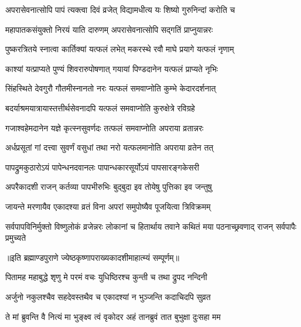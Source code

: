 \twolineshloka
{अपरासेवनात्सोपि पापं त्यक्त्वा दिवं व्रजेत्}
{विद्यामधीत्य यः शिष्यो गुरुनिन्दां करोति च} %

\twolineshloka
{महापातकसंयुक्तो निरयं याति दारुणम्}
{अपरासेवनात्सोपि सद्गतिं प्राप्नुयान्नरः} %

\twolineshloka
{पुष्करत्रितये स्नात्वा कार्तिक्यां यत्फलं लभेत्}
{मकरस्थे रवौ माघे प्रयागे यत्फलं नृणाम्} %

\twolineshloka
{काश्यां यत्प्राप्यते पुण्यं शिवरारुपोषणात्}
{गयायां पिण्डदानेन यत्फलं प्राप्यते नृभिः} %

\twolineshloka
{सिंहस्थिते देवगुरौ गौतमीस्नानतो नरः}
{यत्फलं समवाप्नोति कुम्भे केदारदर्शनात्} %

\twolineshloka
{बदर्याश्रमयात्रायास्तत्तीर्थसेवनादपि}
{यत्फलं समवाप्नोति कुरुक्षेत्रे रविग्रहे} %

\twolineshloka
{गजाश्वहेमदानेन यज्ञे कृत्स्नसुवर्णदः}
{तत्फलं समवाप्नोति अपराया व्रतान्नरः} %

\twolineshloka
{अर्धप्रसूतां गां दत्त्वा सुवर्णं वसुधां तथा}
{नरो यत्फलमानोति अपराया व्रतेन तत्} %

\twolineshloka
{पापद्रुमकुठारोऽयं पापेन्धनदवानलः}
{पापान्धकारसूर्योऽयं पापसारङ्गकेसरी} %

\twolineshloka
{अपरैकादशी राजन् कर्तव्या पापभीरुभिः}
{बुद्बुदा इव तोयेषु पुत्तिका इव जन्तुषु} %

\twolineshloka
{जायन्ते मरणायैव एकादश्या व्रतं विना}
{अपरां समुपोष्यैव पूजयित्वा त्रिविक्रमम्} %


\threelineshloka
{सर्वपापविनिर्मुक्तो विष्णुलोकं व्रजेन्नरः}
{लोकानां च हितार्थाय तवाने कथितं मया}
{पठनाच्छ्रवणाद् राजन् सर्वपापैः प्रमुच्यते} %

॥इति ब्रह्माण्डपुराणे ज्येष्ठकृष्णापराख्यकादशीमाहात्म्यं सम्पूर्णम्॥


\hyperref[sec:ekadashi_mahatmyam_vrata_raja]{\closesub}
\clearpage

\label{sec:vrata-raja-jyeshtha-shukla-nirjala}


\twolineshloka
{पितामह महाबुद्धे शृणु मे परमं वचः}
{युधिष्ठिरश्च कुन्ती च तथा द्रुपद नन्दिनी} %

\twolineshloka
{अर्जुनो नकुलश्चैव सहदेवस्तथैव च}
{एकादश्यां न भुञ्जन्ति कदाचिदपि सुव्रत} %

\twolineshloka
{ते मां ब्रुवन्ति वै नित्यं मा भुङ्क्ष्व त्वं वृकोदर}
{अहं तानब्रुवं तात बुभुक्षा दुःसहा मम} %

